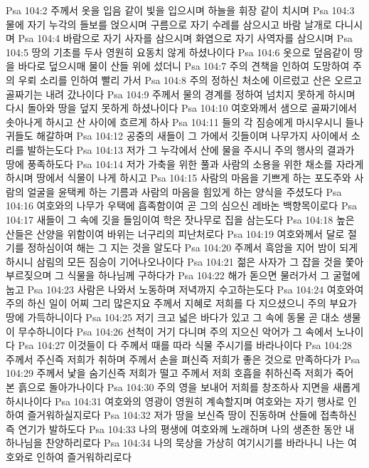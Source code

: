 Psa 104:2  주께서 옷을 입음 같이 빛을 입으시며 하늘을 휘장 같이 치시며
Psa 104:3  물에 자기 누각의 들보를 얹으시며 구름으로 자기 수레를 삼으시고 바람 날개로 다니시며
Psa 104:4  바람으로 자기 사자를 삼으시며 화염으로 자기 사역자를 삼으시며
Psa 104:5  땅의 기초를 두사 영원히 요동치 않게 하셨나이다
Psa 104:6  옷으로 덮음같이 땅을 바다로 덮으시매 물이 산들 위에 섰더니
Psa 104:7  주의 견책을 인하여 도망하여 주의 우뢰 소리를 인하여 빨리 가서
Psa 104:8  주의 정하신 처소에 이르렀고 산은 오르고 골짜기는 내려 갔나이다
Psa 104:9  주께서 물의 경계를 정하여 넘치지 못하게 하시며 다시 돌아와 땅을 덮지 못하게 하셨나이다
Psa 104:10  여호와께서 샘으로 골짜기에서 솟아나게 하시고 산 사이에 흐르게 하사
Psa 104:11  들의 각 짐승에게 마시우시니 들나귀들도 해갈하며
Psa 104:12  공중의 새들이 그 가에서 깃들이며 나무가지 사이에서 소리를 발하는도다
Psa 104:13  저가 그 누각에서 산에 물을 주시니 주의 행사의 결과가 땅에 풍족하도다
Psa 104:14  저가 가축을 위한 풀과 사람의 소용을 위한 채소를 자라게 하시며 땅에서 식물이 나게 하시고
Psa 104:15  사람의 마음을 기쁘게 하는 포도주와 사람의 얼굴을 윤택케 하는 기름과 사람의 마음을 힘있게 하는 양식을 주셨도다
Psa 104:16  여호와의 나무가 우택에 흡족함이여 곧 그의 심으신 레바논 백향목이로다
Psa 104:17  새들이 그 속에 깃을 들임이여 학은 잣나무로 집을 삼는도다
Psa 104:18  높은 산들은 산양을 위함이여 바위는 너구리의 피난처로다
Psa 104:19  여호와께서 달로 절기를 정하심이여 해는 그 지는 것을 알도다
Psa 104:20  주께서 흑암을 지어 밤이 되게 하시니 삼림의 모든 짐승이 기어나오나이다
Psa 104:21  젊은 사자가 그 잡을 것을 쫓아 부르짖으며 그 식물을 하나님께 구하다가
Psa 104:22  해가 돋으면 물러가서 그 굴혈에 눕고
Psa 104:23  사람은 나와서 노동하며 저녁까지 수고하는도다
Psa 104:24  여호와여 주의 하신 일이 어찌 그리 많은지요 주께서 지혜로 저희를 다 지으셨으니 주의 부요가 땅에 가득하니이다
Psa 104:25  저기 크고 넓은 바다가 있고 그 속에 동물 곧 대소 생물이 무수하니이다
Psa 104:26  선척이 거기 다니며 주의 지으신 악어가 그 속에서 노나이다
Psa 104:27  이것들이 다 주께서 때를 따라 식물 주시기를 바라나이다
Psa 104:28  주께서 주신즉 저희가 취하며 주께서 손을 펴신즉 저희가 좋은 것으로 만족하다가
Psa 104:29  주께서 낯을 숨기신즉 저희가 떨고 주께서 저희 호흡을 취하신즉 저희가 죽어 본 흙으로 돌아가나이다
Psa 104:30  주의 영을 보내어 저희를 창조하사 지면을 새롭게 하시나이다
Psa 104:31  여호와의 영광이 영원히 계속할지며 여호와는 자기 행사로 인하여 즐거워하실지로다
Psa 104:32  저가 땅을 보신즉 땅이 진동하며 산들에 접촉하신즉 연기가 발하도다
Psa 104:33  나의 평생에 여호와께 노래하며 나의 생존한 동안 내 하나님을 찬양하리로다
Psa 104:34  나의 묵상을 가상히 여기시기를 바라나니 나는 여호와로 인하여 즐거워하리로다
